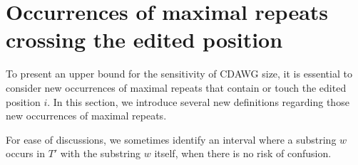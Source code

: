 \section{Occurrences of maximal repeats crossing the edited position}


To present an upper bound for the sensitivity of CDAWG size,
it is essential to consider new occurrences of maximal repeats
that contain or touch the edited position $i$.
%
In this section, we introduce several new definitions regarding
those new occurrences of maximal repeats.

For ease of discussions, we sometimes identify an interval where
a substring $w$ occurs in $T'$ with the substring $w$ itself,
when there is no risk of confusion.



